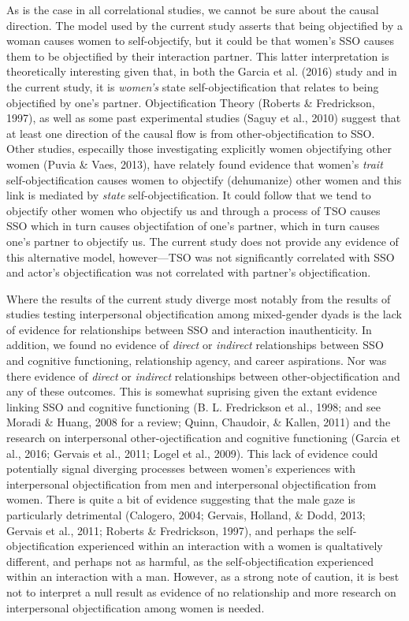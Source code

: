 \documentclass[man]{apa6}
\begin{document}
As is the case in all correlational studies, we cannot be sure about the
causal direction. The model used by the current study asserts that being
objectified by a woman causes women to self-objectify, but it could be
that women's SSO causes them to be objectified by their interaction
partner. This latter interpretation is theoretically interesting given
that, in both the Garcia et al. (2016) study and in the current study,
it is \emph{women's} state self-objectification that relates to being
objectified by one's partner. Objectification Theory (Roberts \&
Fredrickson, 1997), as well as some past experimental studies (Saguy et
al., 2010) suggest that at least one direction of the causal flow is
from other-objectification to SSO. Other studies, especailly those
investigating explicitly women objectifying other women (Puvia \& Vaes,
2013), have relately found evidence that women's \emph{trait}
self-objectification causes women to objectify (dehumanize) other women
and this link is mediated by \emph{state} self-objectification. It could
follow that we tend to objectify other women who objectify us and
through a process of TSO causes SSO which in turn causes objectifation
of one's partner, which in turn causes one's partner to objectify us.
The current study does not provide any evidence of this alternative
model, however---TSO was not significantly correlated with SSO and
actor's objectification was not correlated with partner's
objectification.

Where the results of the current study diverge most notably from the
results of studies testing interpersonal objectification among
mixed-gender dyads is the lack of evidence for relationships between SSO
and interaction inauthenticity. In addition, we found no evidence of
\emph{direct} or \emph{indirect} relationships between SSO and cognitive
functioning, relationship agency, and career aspirations. Nor was there
evidence of \emph{direct} or \emph{indirect} relationships between
other-objectification and any of these outcomes. This is somewhat
suprising given the extant evidence linking SSO and cognitive
functioning (B. L. Fredrickson et al., 1998; and see Moradi \& Huang,
2008 for a review; Quinn, Chaudoir, \& Kallen, 2011) and the research on
interpersonal other-ojectification and cognitive functioning (Garcia et
al., 2016; Gervais et al., 2011; Logel et al., 2009). This lack of
evidence could potentially signal diverging processes between women's
experiences with interpersonal objectification from men and
interpersonal objectification from women. There is quite a bit of
evidence suggesting that the male gaze is particularly detrimental
(Calogero, 2004; Gervais, Holland, \& Dodd, 2013; Gervais et al., 2011;
Roberts \& Fredrickson, 1997), and perhaps the self-objectification
experienced within an interaction with a women is qualtatively
different, and perhaps not as harmful, as the self-objectification
experienced within an interaction with a man. However, as a strong note
of caution, it is best not to interpret a null result as evidence of no
relationship and more research on interpersonal objectification among
women is needed.
\end{document}
